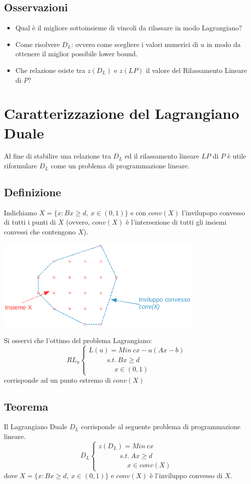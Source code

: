 \subsection{Osservazioni}
\begin{itemize}
	\item Qual è il migliore sottoinsieme di vincoli da rilassare in modo Lagrangiano?
	\item Come risolvere $D_{L}$: ovvero come scegliere i valori numerici di $u$ in modo da ottenere il miglior possibile lower bound.
	\item Che relazione esiste tra $z(D_{L})$ e $z(LP)$ il valore del Rilassamento Lineare di $P$?
\end{itemize}

\section{Caratterizzazione del Lagrangiano Duale}
Al fine di stabilire una relazione tra $D_{L}$ ed il rilassamento lineare $LP$ di $P$ è utile riformulare $D_{L}$ come un problema di programmazione lineare.
\subsection{Definizione}
Indichiamo $X=\{x: Bx\ge d,\ x\in(0,1) \}$ e con $conv(X)$ l'invilupopo convesso di tutti i punti di $X$ (ovvero, $conv(X)$ è l'intersezione di tutti gli insiemi convessi che contengono $X$).
\centerline{\includegraphics[height=4.5cm]{images/graph27.png}}
Si osservi che l'ottimo del problema Lagrangiano:
\begin{displaymath}
	RL_{u}
	\begin{cases}
		L(u)=Min\ cx-u(Ax-b) \\
		\ \ \ \ \ \ \ \ \ \ \ \ s.t.\ Bx\ge d \\
		\ \ \ \ \ \ \ \ \ \ \ \ \ \ \ \ \ x\in (0,1)
	\end{cases}
\end{displaymath}
corrisponde ad un punto estremo di $conv(X)$
\clearpage
\subsection{Teorema}
Il Lagrangiano Duale $D_{L}$ corrisponde al seguente problema di programmazione lineare.
\begin{displaymath}
D_{L}
\begin{cases}
z(D_{L})=Min\ cx \\
\ \ \ \ \ \ \ \ \ \ \ \ \ \ s.t.\ Ax\ge d \\
\ \ \ \ \ \ \ \ \ \ \ \ \ \ \ \ \ \ \ x\in conv(X)
\end{cases}
\end{displaymath}
dove $X=\{x:Bx\ge d,\ x\in(0,1)\}$ e $conv(X)$ è l'inviluppo convesso di $X$.

